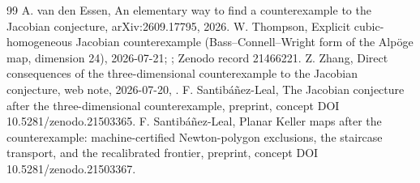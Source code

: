 \documentclass[11pt]{article}
\theoremstyle{remark}
\begin{document}
\begin{thebibliography}{99}
 A. van den Essen, An elementary way to find a counterexample to the Jacobian conjecture, arXiv:2609.17795, 2026.
 W. Thompson, Explicit cubic-homogeneous Jacobian counterexample
(Bass--Connell--Wright form of the Alp\"oge map, dimension 24), 2026-07-21;
; Zenodo
record 21466221.
 Z. Zhang, Direct consequences of the three-dimensional counterexample to the Jacobian conjecture, web note, 2026-07-20, .
 F. Santib\'a\~nez-Leal, The Jacobian conjecture after the three-dimensional counterexample, preprint, concept DOI 10.5281/zenodo.21503365.
 F. Santib\'a\~nez-Leal, Planar Keller maps after the counterexample: machine-certified Newton-polygon exclusions, the staircase transport, and the recalibrated frontier, preprint, concept DOI 10.5281/zenodo.21503367.
\end{thebibliography}
\end{document}
